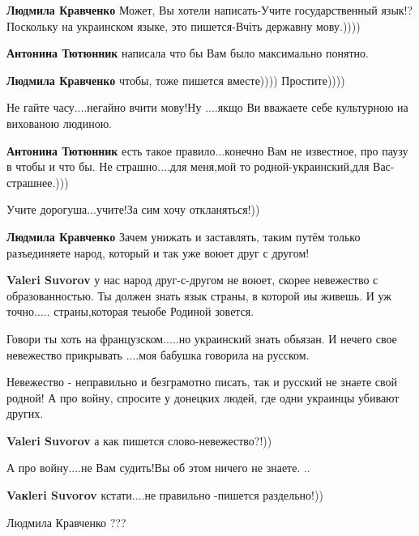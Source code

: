 \begin{itemize}


\textbf{Людмила Кравченко} Может, Вы хотели написать-Учите государственный
язык!? Поскольку на украинском языке, это пишется-Вчіть державну мову.))))

\textbf{Антонина Тютюнник} написала что бы Вам было максимально понятно.

\textbf{Людмила Кравченко} чтобы, тоже пишется вместе)))) Простите))))

Не гайте часу....негайно вчити мову!Ну ....якщо Ви вважаете себе культурною иа вихованою людиною.

\textbf{Антонина Тютюнник} есть такое правило...конечно Вам не известное, про
паузу в чтобы и что бы. Не страшно....для меня,мой то родной-украинский,для
Вас-страшнее.)))

Учите дорогуша...учите!За сим хочу откланяться!))

\textbf{Людмила Кравченко} Зачем унижать и заставлять,
таким путём только разъединяете народ, который и так уже воюет друг с другом!


\textbf{Valeri Suvorov} у нас народ друг-с-другом не воюет, скорее невежество с
образованностью. Ты должен знать язык страны, в которой иы живешь. И уж
точно..... страны,которая теьюбе Родиной зовется.


Говори ты хоть на французском.....но украинский знать обьязан. И нечего свое
невежество прикрывать ....моя бабушка говорила на русском.


Невежество - неправильно и безграмотно писать, так и русский не знаете свой
родной! А про войну, спросите у донецких людей, где одни украинцы убивают
других.

\textbf{Valeri Suvorov} а как пишется слово-невежество?!))

А про войну....не Вам судить!Вы об этом ничего не знаете. ..

\textbf{Vaкleri Suvorov} кстати....не правильно -пишется раздельно!))

Людмила Кравченко ???
\end{itemize}

